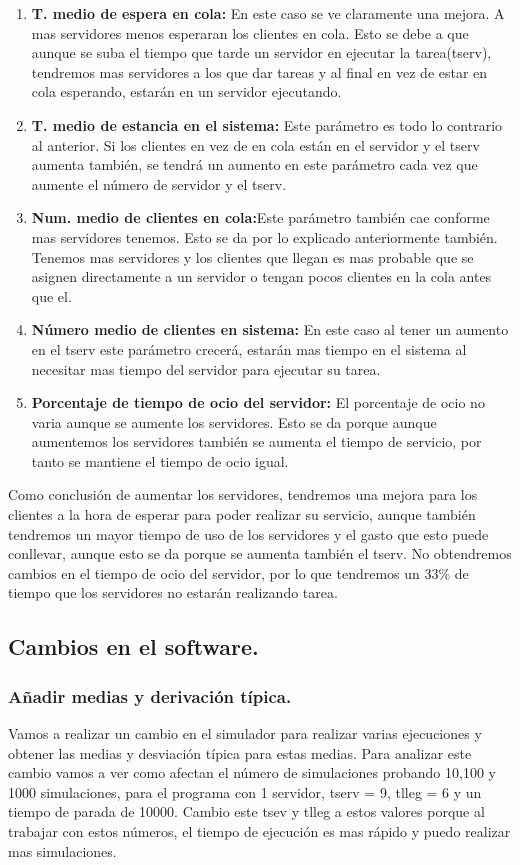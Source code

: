 \documentclass[]{article}
\begin{document}
\begin{enumerate}
	\item \textbf{T. medio de espera en cola: }En este caso se ve claramente una mejora. A mas servidores menos esperaran los clientes en cola. Esto se debe a que aunque se suba el tiempo que tarde un servidor en ejecutar la tarea(tserv), tendremos mas servidores a los que dar tareas y al final en vez de estar en cola esperando, estarán en un servidor ejecutando.
	\item \textbf{T. medio de estancia en el sistema: }Este parámetro es todo lo contrario al anterior. Si los clientes en vez de en cola están en el servidor y el tserv aumenta también, se tendrá un aumento en este parámetro cada vez que aumente el número de servidor y el tserv. 
	\item \textbf{Num. medio de clientes en cola:}Este parámetro también cae conforme mas servidores tenemos. Esto se da por lo explicado anteriormente también. Tenemos mas servidores y los clientes que llegan es mas probable que se asignen directamente a un servidor o tengan pocos clientes en la cola antes que el. 
	
	\item \textbf{Número medio de clientes en sistema: }En este caso al tener un aumento en el tserv este parámetro crecerá, estarán mas tiempo en el sistema al necesitar mas tiempo del servidor para ejecutar su tarea.
	
	\item \textbf{Porcentaje de tiempo de ocio del servidor: }El porcentaje de ocio no varia aunque se aumente los servidores. Esto se da porque aunque aumentemos los servidores también se aumenta el tiempo de servicio, por tanto se mantiene el tiempo de ocio igual.
\end{enumerate}
Como conclusión de aumentar los servidores, tendremos una mejora para los clientes a la hora de esperar para poder realizar su servicio, aunque también tendremos un mayor tiempo de uso de los servidores y el gasto que esto puede conllevar, aunque esto se da porque se aumenta también el tserv. No obtendremos cambios en el tiempo de ocio del servidor, por lo que tendremos un 33\% de tiempo que los servidores no estarán realizando tarea.
\newpage
\subsection{Cambios en el software.}
\subsubsection{Añadir medias y derivación típica.}
Vamos a realizar un cambio en el simulador para realizar varias ejecuciones y obtener las medias y desviación típica para estas medias. 
\newline
Para analizar este cambio vamos a ver como afectan el número de simulaciones probando 10,100 y 1000 simulaciones, para el programa con 1 servidor, tserv = 9, tlleg = 6 y un tiempo de parada de 10000. Cambio este tsev y tlleg a estos valores porque al trabajar con estos números, el tiempo de ejecución es mas rápido y puedo realizar mas simulaciones.
\end{document}
